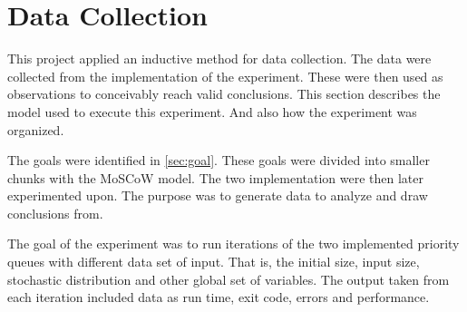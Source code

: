 \documentclass[a4paper,11pt]{kth-mag}
\begin{document}
\begin{table}
    \centering
    \caption{Requirement analysis/requirement overview from course website \cite{web:requirementoverview}}
    \label{tab:reqoverview}
\end{table}

\section{Data Collection}
This project applied an inductive method for data collection.
The data were collected from the implementation of the experiment.
These were then used as observations to conceivably reach valid conclusions.
This section describes the model used to execute this experiment.
And also how the experiment was organized.

The goals were identified in \cref{sec:goal}.
These goals were divided into smaller chunks with the MoSCoW model.
The two implementation were then later experimented upon.
The purpose was to generate data to analyze and draw conclusions from.

The goal of the experiment was to run iterations of the two implemented priority queues with different data set of input.
That is, the initial size, input size, stochastic distribution and other global set of variables.
The output taken from each iteration included data as run time, exit code, errors and performance.
\end{document}
